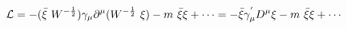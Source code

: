 \begin{equation}
{\cal{L}}= -(\bar{\xi}~W^{-\frac{1}{2}} ) \gamma_\mu \partial^\mu (W^{-\frac{1}{2}}~\xi) -m~\bar{\xi} \xi +\cdots = -\bar{\xi} \gamma_\mu^{'} D^\mu \xi - m~\bar{\xi} \xi + \cdots  \label{eq:v13}
\end{equation}


